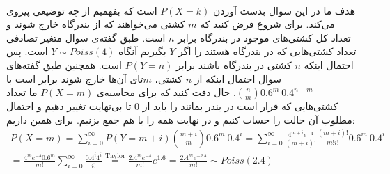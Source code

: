 \\
هدف ما در این سوال بدست آوردن
$P(X = k)$
است که بفهمیم از چه توضیعی پیروی می‌کند.
برای شروع فرض کنید که
$m$
کشتی می‌خواهند که از بندرگاه خارج شوند و تعداد کل کشتی‌های موجود در بندرگاه برابر
$n$
است. طبق گفته‌ی سوال متغیر تصادفی تعداد کشتی‌هایی که در بندرگاه هستند را اگر
$Y$
بگیریم آنگاه
$Y \sim Poiss(4)$
است. پس احتمال اینکه
$n$
کشتی در بندرگاه باشند برابر
$P(Y = n)$
است. همچنین طبق گفته‌های سوال احتمال اینکه از
$n$
کشتی،
$m$تای
آن‌ها خارج شوند برابر است با
${n \choose m} 0.6^m ~ 0.4^{n-m}$.
حال دقت کنید که برای محاسبه‌ی
$P(X = m)$
ما تعداد کشتی‌هایی که قرار است در بندر بمانند را باید از 0 تا بی‌نهایت تغییر دهیم و احتمال مطلوب آن حالت را
حساب کنیم و در نهایت همه را با هم جمع بزنیم. برای همین داریم:
\begin{gather*}
    P(X = m) = \sum_{i=0}^{\infty} P(Y=m+i) {m + i \choose m} 0.6^m ~ 0.4^i
    = \sum_{i=0}^{\infty} \frac{4^{m+i} e^{-4}}{(m+i)!} \frac{(m+i)!}{m! i!} 0.6^m ~ 0.4^i\\
    = \frac{4^m e^{-4} 0.6^m}{m!} \sum_{i=0}^{\infty} \frac{0.4^i 4^i}{i!}
    \stackrel{\text{Taylor}}{=} \frac{2.4^m e^{-4}}{m!} e^{1.6} = \frac{2.4^m e^{-2.4}}{m!} \sim Poiss(2.4)
\end{gather*}